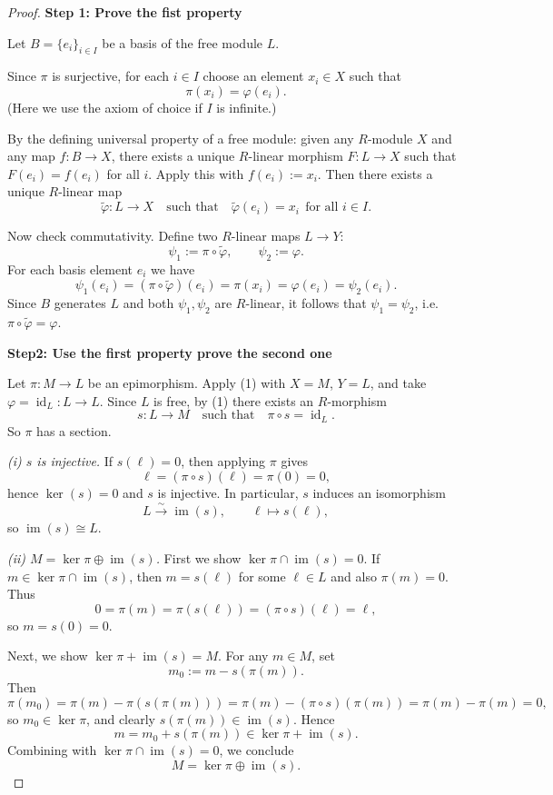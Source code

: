 \documentclass[11pt, a4paper]{report}
\begin{document}
\begin{proof} 
\textbf{Step 1: Prove the fist property}

Let $B=\{e_i\}_{i\in I}$ be a basis of the free module $L$.

Since $\pi$ is surjective, for each $i\in I$ choose an element $x_i\in X$ such that
\[
\pi(x_i)=\varphi(e_i).
\]
(Here we use the axiom of choice if $I$ is infinite.)

By the defining universal property of a free module: given any $R$-module $X$ and any map
$f:B\to X$, there exists a unique $R$-linear morphism $F:L\to X$ such that $F(e_i)=f(e_i)$
for all $i$. Apply this with $f(e_i):=x_i$. Then there exists a unique $R$-linear map
\[
\widetilde\varphi:L\to X
\quad\text{such that}\quad
\widetilde\varphi(e_i)=x_i\ \ \text{for all }i\in I.
\]

Now check commutativity. Define two $R$-linear maps $L\to Y$:
\[
\psi_1:=\pi\circ \widetilde\varphi,
\qquad
\psi_2:=\varphi.
\]
For each basis element $e_i$ we have
\[
\psi_1(e_i)=(\pi\circ \widetilde\varphi)(e_i)=\pi(x_i)=\varphi(e_i)=\psi_2(e_i).
\]
Since $B$ generates $L$ and both $\psi_1,\psi_2$ are $R$-linear, it follows that
$\psi_1=\psi_2$, i.e.\ $\pi\circ \widetilde\varphi=\varphi$.

\textbf{Step2: Use the first property prove the second one}

Let $\pi:M\to L$ be an epimorphism. Apply (1) with $X=M$, $Y=L$, and take
$\varphi=\operatorname{id}_L:L\to L$. Since $L$ is free, by (1) there exists an $R$-morphism
\[
s:L\to M
\quad\text{such that}\quad
\pi\circ s=\operatorname{id}_L.
\]
So $\pi$ has a section.

\noindent\textit{(i) $s$ is injective.}
If $s(\ell)=0$, then applying $\pi$ gives
\[
\ell=(\pi\circ s)(\ell)=\pi(0)=0,
\]
hence $\ker(s)=0$ and $s$ is injective. In particular, $s$ induces an isomorphism
\[
L \xrightarrow{\ \sim\ } \operatorname{im}(s),\qquad \ell\mapsto s(\ell),
\]
so $\operatorname{im}(s)\cong L$.

\noindent\textit{(ii) $M=\ker\pi\oplus \operatorname{im}(s)$.}
First we show $\ker\pi\cap \operatorname{im}(s)=0$. If $m\in \ker\pi\cap \operatorname{im}(s)$, then
$m=s(\ell)$ for some $\ell\in L$ and also $\pi(m)=0$. Thus
\[
0=\pi(m)=\pi(s(\ell))=(\pi\circ s)(\ell)=\ell,
\]
so $m=s(0)=0$.

Next, we show $\ker\pi+\operatorname{im}(s)=M$. For any $m\in M$, set
\[
m_0 := m - s(\pi(m)).
\]
Then
\[
\pi(m_0)=\pi(m)-\pi(s(\pi(m)))=\pi(m)-(\pi\circ s)(\pi(m))=\pi(m)-\pi(m)=0,
\]
so $m_0\in \ker\pi$, and clearly $s(\pi(m))\in \operatorname{im}(s)$. Hence
\[
m = m_0 + s(\pi(m)) \in \ker\pi + \operatorname{im}(s).
\]
Combining with $\ker\pi\cap \operatorname{im}(s)=0$, we conclude
\[
M=\ker\pi\oplus \operatorname{im}(s).
\]
\end{proof}
\end{document}
